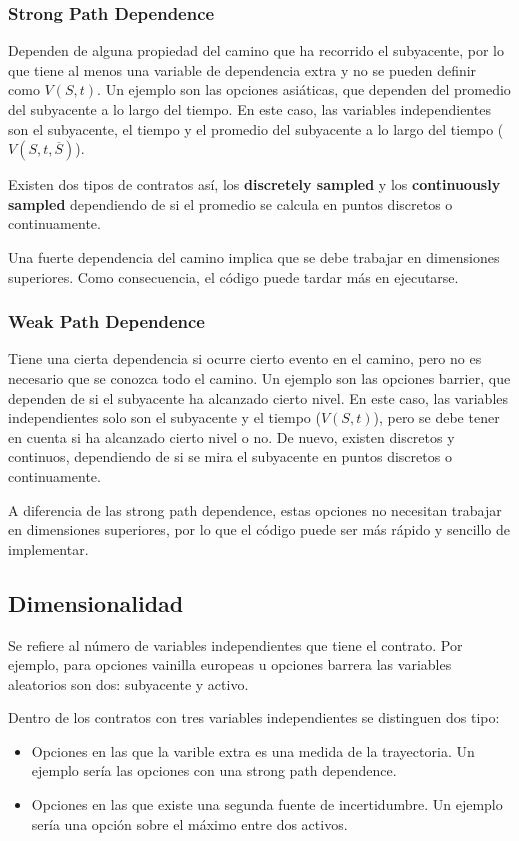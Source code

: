 \subsubsection{Strong Path Dependence}
Dependen de alguna propiedad del camino que ha recorrido el subyacente, por lo que tiene al menos una variable de dependencia extra y no se pueden definir como $V(S,t)$. Un ejemplo son las opciones asiáticas, que dependen del promedio del subyacente a lo largo del tiempo. En este caso, las variables independientes son el subyacente, el tiempo y el promedio del subyacente a lo largo del tiempo ($V(S,t,\overline{S})$).

Existen dos tipos de contratos así, los \textbf{discretely sampled} y los \textbf{continuously sampled} dependiendo de si el promedio se calcula en puntos discretos o continuamente. 

Una fuerte dependencia del camino implica que se debe trabajar en dimensiones superiores. Como consecuencia, el código puede tardar más en ejecutarse.


\subsubsection{Weak Path Dependence}
Tiene una cierta dependencia si ocurre cierto evento en el camino, pero no es necesario que se conozca todo el camino. Un ejemplo son las opciones barrier, que dependen de si el subyacente ha alcanzado cierto nivel. En este caso, las variables independientes solo son el subyacente y el tiempo ($V(S,t)$), pero se debe tener en cuenta si ha alcanzado cierto nivel o no. De nuevo, existen discretos y continuos, dependiendo de si se mira el subyacente en puntos discretos o continuamente.

A diferencia de las strong path dependence, estas opciones no necesitan trabajar en dimensiones superiores, por lo que el código puede ser más rápido y sencillo de implementar.






\subsection{Dimensionalidad}
Se refiere al número de variables independientes que tiene el contrato. Por ejemplo, para opciones vainilla europeas u opciones barrera las variables aleatorios son dos: subyacente y activo.

Dentro de los contratos con tres variables independientes se distinguen dos tipo:
\begin{itemize}
    \item Opciones en las que la varible extra es una medida de la trayectoria. Un ejemplo sería las opciones con una strong path dependence.
    \item Opciones en las que existe una segunda fuente de incertidumbre. Un ejemplo sería una opción sobre el máximo entre dos activos.
\end{itemize}



